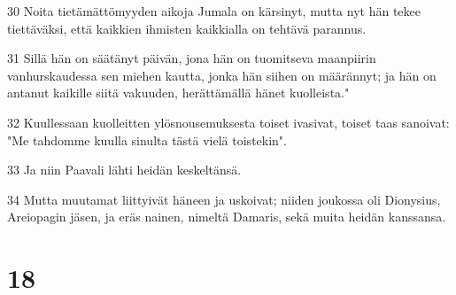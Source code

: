 \par 30 Noita tietämättömyyden aikoja Jumala on kärsinyt, mutta nyt hän tekee tiettäväksi, että kaikkien ihmisten kaikkialla on tehtävä parannus.
\par 31 Sillä hän on säätänyt päivän, jona hän on tuomitseva maanpiirin vanhurskaudessa sen miehen kautta, jonka hän siihen on määrännyt; ja hän on antanut kaikille siitä vakuuden, herättämällä hänet kuolleista."
\par 32 Kuullessaan kuolleitten ylösnousemuksesta toiset ivasivat, toiset taas sanoivat: "Me tahdomme kuulla sinulta tästä vielä toistekin".
\par 33 Ja niin Paavali lähti heidän keskeltänsä.
\par 34 Mutta muutamat liittyivät häneen ja uskoivat; niiden joukossa oli Dionysius, Areiopagin jäsen, ja eräs nainen, nimeltä Damaris, sekä muita heidän kanssansa.

\chapter{18}

